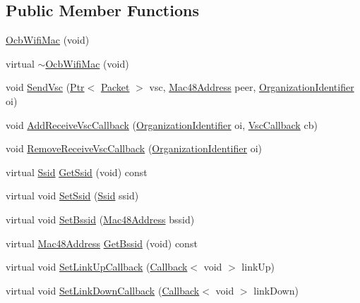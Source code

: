 \subsection*{Public Member Functions}
\begin{DoxyCompactItemize}
\item 
\hyperlink{classns3_1_1OcbWifiMac_a83c28663160fcd8a95149abb14db7c40}{Ocb\+Wifi\+Mac} (void)
\item 
virtual \hyperlink{classns3_1_1OcbWifiMac_a70d4b7e0d280ee2a7a3f4f551c6ddef9}{$\sim$\+Ocb\+Wifi\+Mac} (void)
\item 
void \hyperlink{classns3_1_1OcbWifiMac_a89a354cd6596253ce69e246f437d02f5}{Send\+Vsc} (\hyperlink{classns3_1_1Ptr}{Ptr}$<$ \hyperlink{classns3_1_1Packet}{Packet} $>$ vsc, \hyperlink{classns3_1_1Mac48Address}{Mac48\+Address} peer, \hyperlink{classns3_1_1OrganizationIdentifier}{Organization\+Identifier} oi)
\item 
void \hyperlink{classns3_1_1OcbWifiMac_a7c0fb263e5132757f4aecde8a1c84e4b}{Add\+Receive\+Vsc\+Callback} (\hyperlink{classns3_1_1OrganizationIdentifier}{Organization\+Identifier} oi, \hyperlink{namespacens3_acd51abe7aaf87942dfd56b0e5e1f899f}{Vsc\+Callback} cb)
\item 
void \hyperlink{classns3_1_1OcbWifiMac_ac2d631bc2743b459efa84e61e82bcf8f}{Remove\+Receive\+Vsc\+Callback} (\hyperlink{classns3_1_1OrganizationIdentifier}{Organization\+Identifier} oi)
\item 
virtual \hyperlink{classns3_1_1Ssid}{Ssid} \hyperlink{classns3_1_1OcbWifiMac_accb12f19451d9fd28007ce9639d7d70c}{Get\+Ssid} (void) const 
\item 
virtual void \hyperlink{classns3_1_1OcbWifiMac_a7d7132497b98488ac8486a0e24503ece}{Set\+Ssid} (\hyperlink{classns3_1_1Ssid}{Ssid} ssid)
\item 
virtual void \hyperlink{classns3_1_1OcbWifiMac_a2fbada4fcc9e72da4d51314f93bc0a6c}{Set\+Bssid} (\hyperlink{classns3_1_1Mac48Address}{Mac48\+Address} bssid)
\item 
virtual \hyperlink{classns3_1_1Mac48Address}{Mac48\+Address} \hyperlink{classns3_1_1OcbWifiMac_a52cc6b417527b3c020ccc9ad1e733710}{Get\+Bssid} (void) const 
\item 
virtual void \hyperlink{classns3_1_1OcbWifiMac_a3ccf9cdbe38a3abac33d346b041026a2}{Set\+Link\+Up\+Callback} (\hyperlink{classns3_1_1Callback}{Callback}$<$ void $>$ link\+Up)
\item 
virtual void \hyperlink{classns3_1_1OcbWifiMac_a99906d686b667de32bd7de83463b27ef}{Set\+Link\+Down\+Callback} (\hyperlink{classns3_1_1Callback}{Callback}$<$ void $>$ link\+Down)

\end{DoxyCompactItemize}
